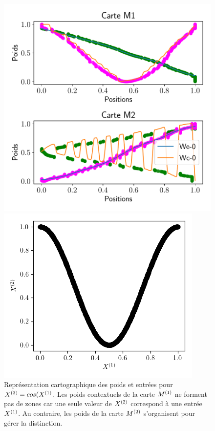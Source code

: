 \documentclass[../main]{subfiles}
\begin{document}
	\begin{figure}
		\begin{minipage}{0.6\textwidth}
		\includegraphics[width=\textwidth]{2som_cos_w.pdf}
		\end{minipage}
		\begin{minipage}{0.4\textwidth}
			\includegraphics[width=\textwidth]{2som_cos_in.png}
		\end{minipage}
		\caption{Représentation cartographique des poids et entrées pour $X^{({2})} = cos(X^{({1})}$. Les poids contextuels de la carte $M^{({1})}$ ne forment pas de zones car une seule valeur de $X^{({2})}$ correspond à une entrée $X^{({1})}$. Au contraire, les poids de la carte $M^{({2})}$ s'organisent pour gérer la distinction. \label{fig:cos_results}}
	\end{figure}
	
\end{document}
